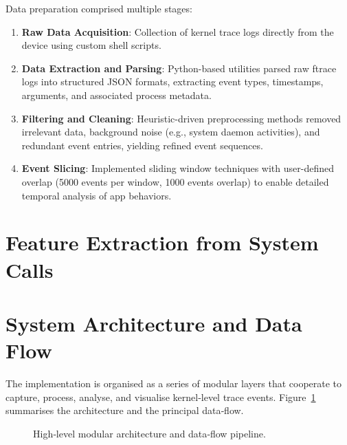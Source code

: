 \documentclass[a4paper,12pt]{report}
\begin{document}
Data preparation comprised multiple stages:
\begin{enumerate}
\item \textbf{Raw Data Acquisition}: Collection of kernel trace logs directly from the device using custom shell scripts.
\item \textbf{Data Extraction and Parsing}: Python-based utilities parsed raw ftrace logs into structured JSON formats, extracting event types, timestamps, arguments, and associated process metadata.
\item \textbf{Filtering and Cleaning}: Heuristic-driven preprocessing methods removed irrelevant data, background noise (e.g., system daemon activities), and redundant event entries, yielding refined event sequences.
\item \textbf{Event Slicing}: Implemented sliding window techniques with user-defined overlap (5000 events per window, 1000 events overlap) to enable detailed temporal analysis of app behaviors.
\end{enumerate}

\section{Feature Extraction from System Calls}


\section{System Architecture and Data Flow}
The implementation is organised as a series of modular layers that cooperate to capture, process, analyse, and visualise kernel‑level trace events. Figure~\ref{fig:architecture}  summarises the architecture and the principal data‑flow.

\begin{figure}[ht]
\centering

\caption{High‑level modular architecture and data‑flow pipeline.}
\label{fig:architecture}
\end{figure}
\end{document}

